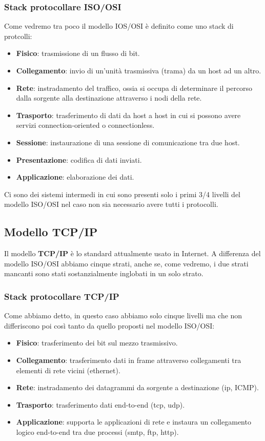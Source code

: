 \subsubsection{Stack protocollare ISO/OSI}
Come vedremo tra poco il modello IOS/OSI è definito come uno stack di
protcolli:
\begin{itemize}
	\item \textbf{Fisico}: trasmissione di un flusso di bit.
	\item \textbf{Collegamento}: invio di un'unità trasmissiva (trama)
		da un host ad un altro.
	\item \textbf{Rete}: instradamento del traffico, ossia si occupa 
		di determinare il percorso dalla sorgente alla destinazione 
		attraverso i nodi della rete.
	\item \textbf{Trasporto}: trasferimento di dati da host a host in 
		cui si possono avere servizi connection-oriented o 
		connectionless.
	\item \textbf{Sessione}: instaurazione di una sessione di 
		comunicazione tra due host.
	\item \textbf{Presentazione}: codifica di dati inviati.
	\item \textbf{Applicazione}: elaborazione dei dati.
\end{itemize}
Ci sono dei sistemi intermedi in cui sono presenti solo i primi 3/4 
livelli del modello ISO/OSI nel caso non sia necessario avere tutti i
protocolli.

\subsection{Modello TCP/IP}
Il modello \textbf{TCP/IP} è lo standard attualmente usato in Internet.
A differenza del modello ISO/OSI abbiamo cinque strati, anche se, come
vedremo, i due strati mancanti sono stati sostanzialmente inglobati in
un solo strato.

\subsubsection{Stack protocollare TCP/IP}
Come abbiamo detto, in questo caso abbiamo solo cinque livelli ma che 
non differiscono poi così tanto da quello proposti nel modello ISO/OSI:
\begin{itemize}
	\item \textbf{Fisico}: trasferimento dei bit sul mezzo trasmissivo.
	\item \textbf{Collegamento}: trasferimento dati in frame attraverso
		collegamenti tra elementi di rete vicini (ethernet).
	\item \textbf{Rete}: instradamento dei datagrammi da sorgente a
		destinazione (ip, ICMP).
	\item \textbf{Trasporto}: trasferimento dati end-to-end (tcp, 
		udp).
	\item \textbf{Applicazione}: supporta le applicazioni di rete e
		instaura un collegamento logico end-to-end tra due processi
		(smtp, ftp, http).
\end{itemize}
